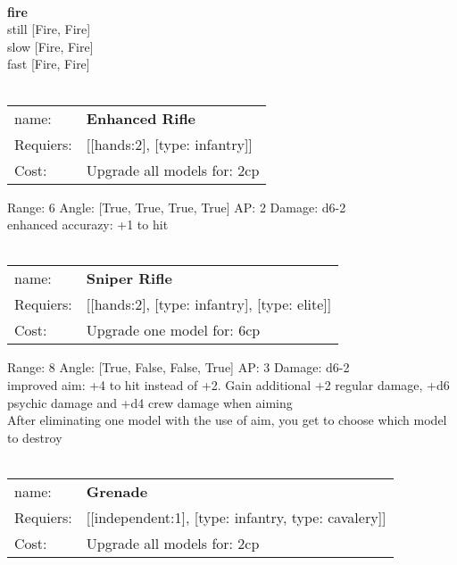 \ \\ {\bf fire } \\
still [Fire, Fire] \\
slow [Fire, Fire] \\
fast [Fire, Fire] \\

\ \\
\begin{tabular}{ll}
name: & {\bf Enhanced Rifle } \\
Requiers: & [[hands:2], [type: infantry]] \\
Cost: & Upgrade all models for: 2cp \\
\end{tabular}



Range: 6  Angle: [True, True, True, True] AP: 2 Damage: d6-2 \\
enhanced accurazy: +1 to hit\\ 








\ \\
\begin{tabular}{ll}
name: & {\bf Sniper Rifle } \\
Requiers: & [[hands:2], [type: infantry], [type: elite]] \\
Cost: & Upgrade one model for: 6cp \\
\end{tabular}



Range: 8  Angle: [True, False, False, True] AP: 3 Damage: d6-2 \\
improved aim: +4 to hit instead of +2. Gain additional +2 regular damage, +d6 psychic damage and +d4 crew damage when aiming\\ 
After eliminating one model with the use of aim, you get to choose which model to destroy\\ 








\ \\
\begin{tabular}{ll}
name: & {\bf Grenade } \\
Requiers: & [[independent:1], [type: infantry, type: cavalery]] \\
Cost: & Upgrade all models for: 2cp \\
\end{tabular}



